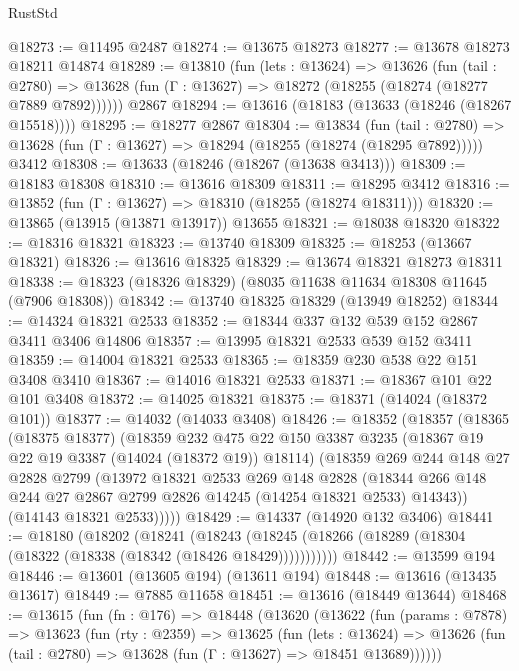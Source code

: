 \begin{lexlean}{RustStd}
\begin{coremodule}
@18273 := @11495 @2487
@18274 := @13675 @18273
@18277 := @13678 @18273 @18211 @14874
@18289 := @13810
    (fun (lets : @13624) =>
    @13626
      (fun (tail : @2780) =>
      @13628 (fun (Γ : @13627) => @18272 (@18255 (@18274 (@18277 @7889 @7892))))))
    @2867
@18294 := @13616 (@18183 (@13633 (@18246 (@18267 @15518))))
@18295 := @18277 @2867
@18304 := @13834
    (fun (tail : @2780) => @13628 (fun (Γ : @13627) => @18294 (@18255 (@18274 (@18295 @7892)))))
    @3412
@18308 := @13633 (@18246 (@18267 (@13638 @3413)))
@18309 := @18183 @18308
@18310 := @13616 @18309
@18311 := @18295 @3412
@18316 := @13852 (fun (Γ : @13627) => @18310 (@18255 (@18274 @18311)))
@18320 := @13865 (@13915 (@13871 @13917)) @13655
@18321 := @18038 @18320
@18322 := @18316 @18321
@18323 := @13740 @18309
@18325 := @18253 (@13667 @18321)
@18326 := @13616 @18325
@18329 := @13674 @18321 @18273 @18311
@18338 := @18323 (@18326 @18329) (@8035 @11638 @11634 @18308 @11645 (@7906 @18308))
@18342 := @13740 @18325 @18329 (@13949 @18252)
@18344 := @14324 @18321 @2533
@18352 := @18344 @337 @132 @539 @152 @2867 @3411 @3406 @14806
@18357 := @13995 @18321 @2533 @539 @152 @3411
@18359 := @14004 @18321 @2533
@18365 := @18359 @230 @538 @22 @151 @3408 @3410
@18367 := @14016 @18321 @2533
@18371 := @18367 @101 @22 @101 @3408
@18372 := @14025 @18321
@18375 := @18371 (@14024 (@18372 @101))
@18377 := @14032 (@14033 @3408)
@18426 := @18352
    (@18357
      (@18365
        (@18375 @18377)
        (@18359
          @232
          @475
          @22
          @150
          @3387
          @3235
          (@18367 @19 @22 @19 @3387 (@14024 (@18372 @19)) @18114)
          (@18359
            @269
            @244
            @148
            @27
            @2828
            @2799
            (@13972
              @18321
              @2533
              @269
              @148
              @2828
              (@18344 @266 @148 @244 @27 @2867 @2799 @2826 @14245 (@14254 @18321 @2533) @14343))
            (@14143 @18321 @2533)))))
@18429 := @14337 (@14920 @132 @3406)
@18441 := @18180
    (@18202
      (@18241
        (@18243 (@18245 (@18266 (@18289 (@18304 (@18322 (@18338 (@18342 (@18426 @18429)))))))))))
@18442 := @13599 @194
@18446 := @13601 (@13605 @194) (@13611 @194)
@18448 := @13616 (@13435 @13617)
@18449 := @7885 @11658
@18451 := @13616 (@18449 @13644)
@18468 := @13615
    (fun (fn : @176) =>
    @18448
      (@13620
        (@13622
          (fun (params : @7878) =>
          @13623
            (fun (rty : @2359) =>
            @13625
              (fun (lets : @13624) =>
              @13626 (fun (tail : @2780) => @13628 (fun (Γ : @13627) => @18451 @13689))))))

\end{coremodule}
\end{lexlean}
